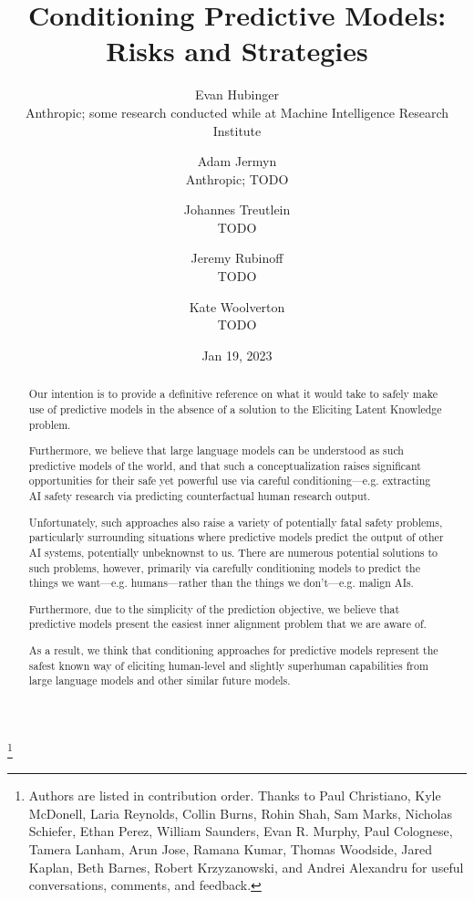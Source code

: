 \documentclass[
  onecolumn,
  natbib,
]{miri-tech-article}
\begin{document}
\title{Conditioning Predictive Models: Risks and Strategies}

\author{Evan Hubinger \\ Anthropic; some research conducted while at Machine Intelligence Research Institute}
\author{Adam Jermyn \\ Anthropic; TODO}
\author{Johannes Treutlein \\ TODO}
\author{Jeremy Rubinoff \\ TODO}
\author{Kate Woolverton \\ TODO}

\thanks{Authors are listed in contribution order. Thanks to Paul Christiano, Kyle McDonell, Laria Reynolds, Collin Burns, Rohin Shah, Sam Marks, Nicholas Schiefer, Ethan Perez, William Saunders, Evan R. Murphy, Paul Colognese, Tamera Lanham, Arun Jose, Ramana Kumar, Thomas Woodside, Jared Kaplan, Beth Barnes, Robert Krzyzanowski, and Andrei Alexandru for useful conversations, comments, and feedback.}

\date{Jan 19, 2023}

\maketitle

\begin{abstract}
    Our intention is to provide a definitive reference on what it would take to safely make use of predictive models in the absence of a solution to the Eliciting Latent Knowledge\cite{elk} problem.

    Furthermore, we believe that large language models can be understood as such predictive models of the world, and that such a conceptualization raises significant opportunities for their safe yet powerful use via careful conditioning---e.g. extracting AI safety research via predicting counterfactual human research output.

    Unfortunately, such approaches also raise a variety of potentially fatal safety problems, particularly surrounding situations where predictive models predict the output of other AI systems, potentially unbeknownst to us. There are numerous potential solutions to such problems, however, primarily via carefully conditioning models to predict the things we want---e.g. humans---rather than the things we don't---e.g. malign AIs.

    Furthermore, due to the simplicity of the prediction objective, we believe that predictive models present the easiest inner alignment problem that we are aware of.

    As a result, we think that conditioning approaches for predictive models represent the safest known way of eliciting human-level and slightly superhuman capabilities from large language models and other similar future models.
\end{abstract}
\end{document}

